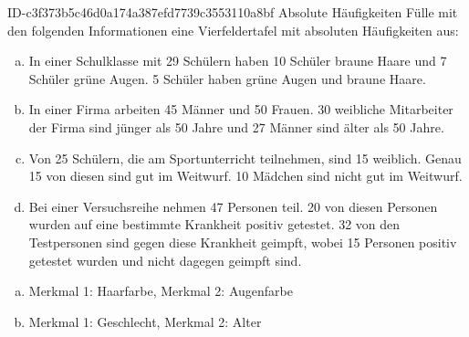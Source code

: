 \begin{exercise}
      {ID-c3f373b5c46d0a174a387efd7739c3553110a8bf}
      {Absolute Häufigkeiten}
  \ifproblem\problem
    Fülle mit den folgenden Informationen eine Vierfeldertafel mit
    absoluten Häufigkeiten aus:
    \begin{enumerate}[a)]
      \item In einer Schulklasse mit \num{29} Schülern haben \num{10} Schüler braune Haare
            und \num{7} Schüler grüne Augen. \num{5} Schüler haben grüne Augen und braune Haare.
      \item In einer Firma arbeiten \num{45} Männer und \num{50} Frauen. \num{30} weibliche Mitarbeiter
            der Firma sind jünger als 50 Jahre und \num{27} Männer sind älter als 50 Jahre.
      \item Von \num{25} Schülern, die am Sportunterricht teilnehmen, sind \num{15} weiblich.
            Genau \num{15} von diesen sind gut im Weitwurf.
            \num{10} Mädchen sind nicht gut im Weitwurf.
      \item Bei einer Versuchsreihe nehmen \num{47} Personen teil. \num{20} von diesen Personen
            wurden auf eine bestimmte Krankheit positiv getestet. \num{32} von den
            Testpersonen sind gegen diese Krankheit geimpft, wobei \num{15} Personen
            positiv getestet wurden und nicht dagegen geimpft sind.
    \end{enumerate}
  \fi
  \ifoutline\outline
    \begin{enumerate}[a)]
      \item Merkmal 1: Haarfarbe, Merkmal 2: Augenfarbe
      \item Merkmal 1: Geschlecht, Merkmal 2: Alter
        \begin{center}
          \begin{fourfoldtable}
          \end{fourfoldtable}%
          \hspace{3em}%
          \begin{fourfoldtable}%
          \end{fourfoldtable}%
        \end{center}\medskip

\end{enumerate}
\end{exercise}
